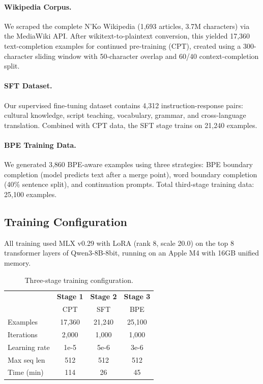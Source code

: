 \documentclass[11pt]{article}
\begin{document}
\paragraph{Wikipedia Corpus.}
We scraped the complete N'Ko Wikipedia (1,693 articles, 3.7M characters) via the MediaWiki API.
After wikitext-to-plaintext conversion, this yielded 17,360 text-completion examples for continued pre-training (CPT), created using a 300-character sliding window with 50-character overlap and 60/40 context-completion split.

\paragraph{SFT Dataset.}
Our supervised fine-tuning dataset contains 4,312 instruction-response pairs: cultural knowledge, script teaching, vocabulary, grammar, and cross-language translation.
Combined with CPT data, the SFT stage trains on 21,240 examples.

\paragraph{BPE Training Data.}
We generated 3,860 BPE-aware examples using three strategies: BPE boundary completion (model predicts text after a merge point), word boundary completion (40\% sentence split), and continuation prompts.
Total third-stage training data: 25,100 examples.

\subsection{Training Configuration}

All training used MLX v0.29 with LoRA (rank 8, scale 20.0) on the top 8 transformer layers of Qwen3-8B-8bit, running on an Apple M4 with 16GB unified memory.

\begin{table}[t]
\centering
\small
\begin{tabular}{lccc}
\toprule
& \textbf{Stage 1} & \textbf{Stage 2} & \textbf{Stage 3} \\
& CPT & SFT & BPE \\
\midrule
Examples & 17,360 & 21,240 & 25,100 \\
Iterations & 2,000 & 1,000 & 1,000 \\
Learning rate & 1e-5 & 5e-6 & 3e-6 \\
Max seq len & 512 & 512 & 512 \\
Time (min) & 114 & 26 & 45 \\
\bottomrule
\end{tabular}
\caption{Three-stage training configuration.}
\label{tab:training-config}
\end{table}
\end{document}
